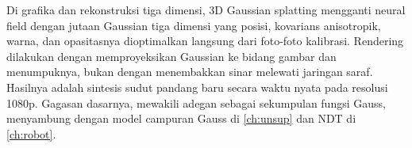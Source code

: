 Di grafika dan rekonstruksi tiga dimensi, 3D Gaussian splatting \citep{kerbl2023} mengganti neural field dengan jutaan
Gaussian tiga dimensi yang posisi, kovarians anisotropik, warna, dan opasitasnya dioptimalkan langsung dari foto-foto
kalibrasi. Rendering dilakukan dengan memproyeksikan Gaussian ke bidang gambar dan menumpuknya, bukan dengan menembakkan
sinar melewati jaringan saraf. Hasilnya adalah sintesis sudut pandang baru secara waktu nyata pada resolusi 1080p.
Gagasan dasarnya, mewakili adegan sebagai sekumpulan fungsi Gauss, menyambung dengan model campuran Gauss di
\cref{ch:unsup} dan NDT di \cref{ch:robot}.

